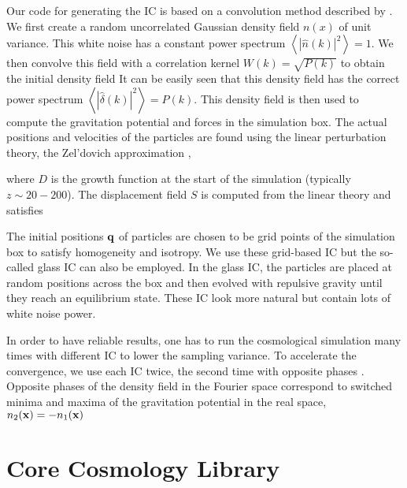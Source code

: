 Our code for generating the IC is based on a convolution method described by \textcite{1997ApJ...490L.127P}. We first create a random uncorrelated Gaussian density field $n(x)$ of unit variance. This white noise has a constant power spectrum $\left\langle|\hat n(k)|^2\right\rangle=1$. We then convolve this field with a correlation kernel $W(k)=\sqrt{P(k)}$ to obtain the initial  density field
It can be easily seen that this density field has the correct power spectrum $\left\langle|\hat\delta(k)|^2\right\rangle=P(k)$. This density field is then used to compute the gravitation potential and forces in the simulation box. The actual positions and velocities of the particles are found using the linear perturbation theory, the Zel'dovich approximation \parencite{1970A&A.....5...84Z},
\begin{sloppypar}
where $D$ is the growth function at the start of the simulation (typically ${z\sim20-200}$). The displacement field $S$ is computed from the linear theory and satisfies
\end{sloppypar}
The initial positions $\mathbf q$ of particles are chosen to be grid points of the simulation box to satisfy homogeneity and isotropy. We use these grid-based IC but the so-called glass IC can also be employed. In the glass IC, the particles are placed at random positions across the box and then evolved with repulsive gravity until they reach an equilibrium state. These IC look more natural but contain lots of white noise power.

In order to have reliable results, one has to run the cosmological simulation many times with different IC to lower the sampling variance. To accelerate the convergence, we use each IC twice, the second time with opposite phases \parencite{PhysRevD.93.103519}. Opposite phases of the density field in the Fourier space correspond to switched minima and maxima of the gravitation potential in the real space, $n_2(\mathbf x)=-n_1(\mathbf x)$

\section{Core Cosmology Library}

